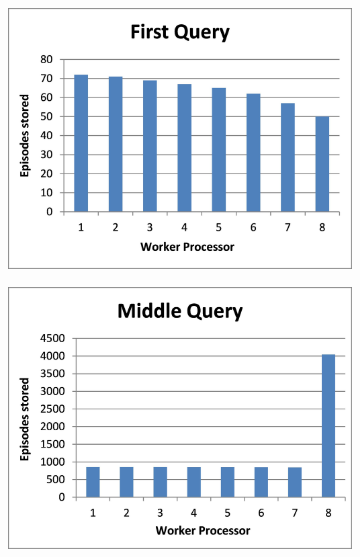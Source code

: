 \documentclass[11pt]{article} %
\begin{document}
\begin{figure}
        \centering
        \begin{subfigure}[b]{0.33\textwidth}
                \centering
                \includegraphics[width=\textwidth]{images/firstquery2}
                \label{fig:randdynam1}
        \end{subfigure}%
        \begin{subfigure}[b]{0.33\textwidth}
                \centering
                \includegraphics[width=\textwidth]{images/randmiddlequery}
                \label{fig:randdynam2}

\end{subfigure}
\end{figure}
\end{document}
